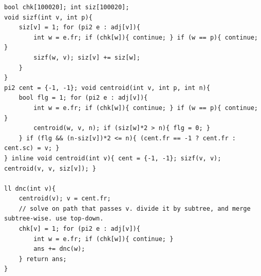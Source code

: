 \begin{verbatim}
bool chk[100020]; int siz[100020];
void sizf(int v, int p){
	siz[v] = 1; for (pi2 e : adj[v]){
		int w = e.fr; if (chk[w]){ continue; } if (w == p){ continue; }
		sizf(w, v); siz[v] += siz[w];
	}
}
pi2 cent = {-1, -1}; void centroid(int v, int p, int n){
	bool flg = 1; for (pi2 e : adj[v]){
		int w = e.fr; if (chk[w]){ continue; } if (w == p){ continue; }
		centroid(w, v, n); if (siz[w]*2 > n){ flg = 0; }
	} if (flg && (n-siz[v])*2 <= n){ (cent.fr == -1 ? cent.fr : cent.sc) = v; }
} inline void centroid(int v){ cent = {-1, -1}; sizf(v, v); centroid(v, v, siz[v]); }

ll dnc(int v){
	centroid(v); v = cent.fr;
	// solve on path that passes v. divide it by subtree, and merge subtree-wise. use top-down.
	chk[v] = 1; for (pi2 e : adj[v]){
		int w = e.fr; if (chk[w]){ continue; }
		ans += dnc(w);
	} return ans;
}
\end{verbatim}